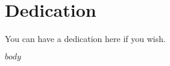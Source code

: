 \documentclass[12pt,twoside]{reedthesis}
\begin{document}
	\chapter*{Dedication}
	You can have a dedication here if you wish.

  \mainmatter %
  \pagestyle{fancyplain} %

  $body$

%
%
%
%
%  
%
\end{document}
